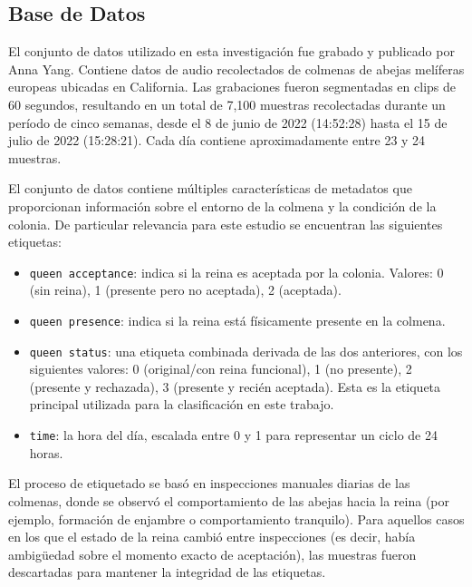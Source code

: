\documentclass[12pt]{report}
\newenvironment{tightmulticols}{%
  \begin{multicols}{2}
  \setlength{\parskip}{0pt}
  \setlength{\parindent}{0em}
  \linespread{1}\selectfont
}{%
  \end{multicols}
}
\begin{document}
\begin{tightmulticols}

\section{Base de Datos}

El conjunto de datos utilizado en esta investigación fue grabado y publicado por Anna Yang\cite{AnnaYang-Dataset}. Contiene datos de audio recolectados de colmenas de abejas melíferas europeas ubicadas en California. Las grabaciones fueron segmentadas en clips de 60 segundos, resultando en un total de 7,100 muestras recolectadas durante un período de cinco semanas, desde el 8 de junio de 2022 (14:52:28) hasta el 15 de julio de 2022 (15:28:21). Cada día contiene aproximadamente entre 23 y 24 muestras.

El conjunto de datos contiene múltiples características de metadatos que proporcionan información sobre el entorno de la colmena y la condición de la colonia. De particular relevancia para este estudio se encuentran las siguientes etiquetas:

\begin{itemize}
	\item[\ding{43}] \texttt{queen acceptance}: indica si la reina es aceptada por la colonia. Valores: 0 (sin reina), 1 (presente pero no aceptada), 2 (aceptada).
	\item[\ding{43}] \texttt{queen presence}: indica si la reina está físicamente presente en la colmena.
	\item[\ding{43}] \texttt{queen status}: una etiqueta combinada derivada de las dos anteriores, con los siguientes valores: 0 (original/con reina funcional), 1 (no presente), 2 (presente y rechazada), 3 (presente y recién aceptada). Esta es la etiqueta principal utilizada para la clasificación en este trabajo.
	\item[\ding{43}] \texttt{time}: la hora del día, escalada entre 0 y 1 para representar un ciclo de 24 horas.
\end{itemize}

El proceso de etiquetado se basó en inspecciones manuales diarias de las colmenas, donde se observó el comportamiento de las abejas hacia la reina (por ejemplo, formación de enjambre o comportamiento tranquilo). Para aquellos casos en los que el estado de la reina cambió entre inspecciones (es decir, había ambigüedad sobre el momento exacto de aceptación), las muestras fueron descartadas para mantener la integridad de las etiquetas.

\end{tightmulticols}
\end{document}
